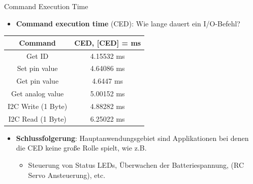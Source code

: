 \documentclass{beamer}
\begin{document}
\begin{frame}{Command Execution Time}
	\begin{itemize}
		\item \textbf{Command execution time} (CED): Wie lange dauert ein I/O-Befehl?
	\end{itemize}
	\begin{table}[htbp]
		\begin{tabular}{|c|c|}
			\hline 
			\textbf{Command} & \textbf{CED, [CED] = ms} \\ 
			\hline \hline 
			Get ID & 4.15532 ms \\ 
			\hline 
			Set pin value & 4.64086 ms  \\ 
			\hline
			Get pin value & 4.6447 ms \\ 
			\hline
			Get analog value & 5.00152 ms \\ 
			\hline
			I2C Write (1 Byte)  & 4.88282 ms\\ 
			\hline
			I2C Read (1 Byte) & 6.25022 ms \\
			\hline
		\end{tabular}
	\end{table}
	\begin{itemize}
		\item \textbf{Schlussfolgerung}: Hauptanwendungsgebiet sind Applikationen bei denen die CED keine gro\ss{}e Rolle spielt, wie z.B.
		\begin{itemize}
			\item Steuerung von Status LEDs, \"Uberwachen der Batteriespannung, (RC Servo Ansteuerung), etc.
		\end{itemize}
	\end{itemize}
\end{frame}
\end{document}
